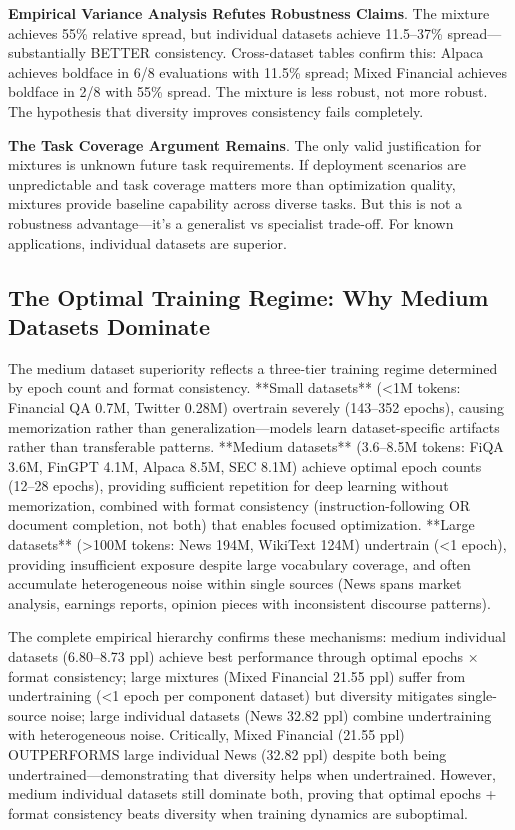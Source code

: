 \textbf{Empirical Variance Analysis Refutes Robustness Claims}. The mixture achieves 55\% relative spread, but individual datasets achieve 11.5–37\% spread—substantially BETTER consistency. Cross-dataset tables confirm this: Alpaca achieves boldface in 6/8 evaluations with 11.5\% spread; Mixed Financial achieves boldface in 2/8 with 55\% spread. The mixture is less robust, not more robust. The hypothesis that diversity improves consistency fails completely.

\textbf{The Task Coverage Argument Remains}. The only valid justification for mixtures is unknown future task requirements. If deployment scenarios are unpredictable and task coverage matters more than optimization quality, mixtures provide baseline capability across diverse tasks. But this is not a robustness advantage—it's a generalist vs specialist trade-off. For known applications, individual datasets are superior.

\subsection{The Optimal Training Regime: Why Medium Datasets Dominate}

The medium dataset superiority reflects a three-tier training regime determined by epoch count and format consistency. **Small datasets** (<1M tokens: Financial QA 0.7M, Twitter 0.28M) overtrain severely (143–352 epochs), causing memorization rather than generalization—models learn dataset-specific artifacts rather than transferable patterns. **Medium datasets** (3.6–8.5M tokens: FiQA 3.6M, FinGPT 4.1M, Alpaca 8.5M, SEC 8.1M) achieve optimal epoch counts (12–28 epochs), providing sufficient repetition for deep learning without memorization, combined with format consistency (instruction-following OR document completion, not both) that enables focused optimization. **Large datasets** (>100M tokens: News 194M, WikiText 124M) undertrain (<1 epoch), providing insufficient exposure despite large vocabulary coverage, and often accumulate heterogeneous noise within single sources (News spans market analysis, earnings reports, opinion pieces with inconsistent discourse patterns).

The complete empirical hierarchy confirms these mechanisms: medium individual datasets (6.80–8.73 ppl) achieve best performance through optimal epochs × format consistency; large mixtures (Mixed Financial 21.55 ppl) suffer from undertraining (<1 epoch per component dataset) but diversity mitigates single-source noise; large individual datasets (News 32.82 ppl) combine undertraining with heterogeneous noise. Critically, Mixed Financial (21.55 ppl) OUTPERFORMS large individual News (32.82 ppl) despite both being undertrained—demonstrating that diversity helps when undertrained. However, medium individual datasets still dominate both, proving that optimal epochs + format consistency beats diversity when training dynamics are suboptimal.

